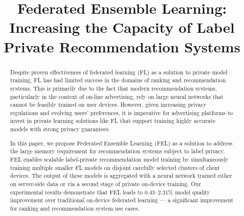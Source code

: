 \documentclass{article}
\title{Federated Ensemble Learning: Increasing the Capacity of Label Private Recommendation Systems}
\begin{document}
\maketitle
\begin{abstract}
\vspace{-0.25cm}
Despite proven effectiveness of federated learning (FL) as a solution to private model training, FL has had limited success in the domains of ranking and recommendation systems. This is primarily due to the fact that modern recommendation systems, particularly in the context of on-line advertising, rely on large neural networks that cannot be feasibly trained on user devices.
However, given increasing privacy regulations and evolving users' preferences, it is imperative for advertising platforms to invest in private learning solutions like FL that support training highly accurate models with strong privacy guarantees.

In this paper, we propose Federated Ensemble Learning (FEL) as a solution to address the large memory requirement for recommendation systems subject to label privacy. FEL enables scalable label-private recommendation model training by simultaneously training multiple smaller FL models on disjoint carefully selected clusters of client devices. The output of these models is aggregated with a neural network trained  either on server-side data or via a second stage of private on-device training. Our experimental results demonstrate that FEL leads to 0.43--2.31\% model quality improvement over traditional on-device federated learning --- a significant improvement for ranking and recommendation system use cases.



\end{abstract}
\end{document}
